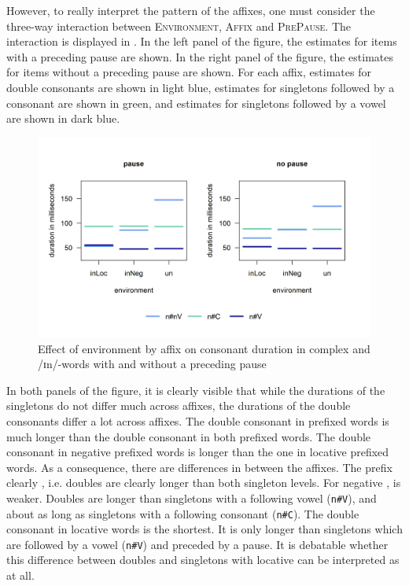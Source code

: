 However, to really interpret the  pattern of the affixes, one must consider the three-way interaction between \textsc{Environment}, \textsc{Affix} and \textsc{PrePause}. The interaction is displayed in . In the left panel of the figure, the estimates for items with a preceding pause are shown. In the right panel of the figure, the estimates for items without a preceding pause are shown. For each affix, estimates for double consonants are shown in light blue, estimates for singletons followed by a consonant are shown in green, and estimates for singletons followed by a vowel are shown in dark blue.






\begin{figure}
	
	\includegraphics [scale=0.6] {images/Experiment/UnInInterEnvAffixPause1}
	
	\caption{Effect of environment by affix on consonant duration in complex  and /ɪn/-words with and without a preceding pause}
	\label{fig:Un In experiment}
\end{figure}


In both panels of the figure, it is clearly visible that while the durations of the singletons do not differ much across affixes, the durations of the double consonants differ a lot across affixes. The double consonant in prefixed words is much longer than the double consonant in both prefixed words.
The double consonant in negative prefixed words is longer than the one in locative prefixed words. 
As a consequence, there are differences in  between the affixes. 
 The prefix  clearly , i.e. doubles are clearly longer than both singleton levels. 
For negative ,  is weaker. Doubles are longer than singletons with a following vowel (\texttt{n\#V}), and about as long as singletons with a following consonant (\texttt{n\#C}). 
The double consonant in locative words is the shortest. It is only longer than singletons which are followed by a vowel (\texttt{n\#V}) and preceded by a pause. It is debatable whether this difference between doubles and singletons with locative  can be interpreted as  at all.

